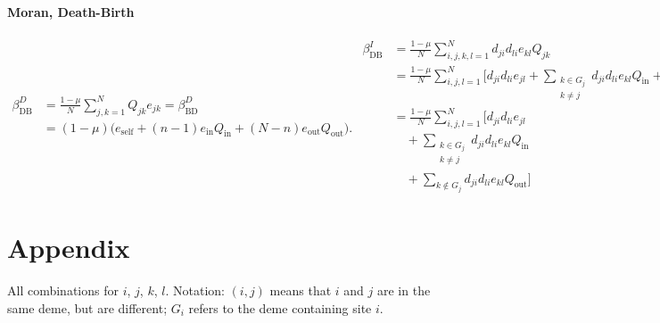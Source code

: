 \documentclass[11pt, letterpaper]{article}
\newcommand{\BD}{\textrm{BD}}
\newcommand{\DB}{\textrm{DB}}
\newcommand{\ein}{e_{\textrm{in}}}
\newcommand{\eself}{e_{\textrm{self}}}
\newcommand{\eout}{e_{\textrm{out}}}
\newcommand{\Qin}{Q_{\textrm{in}}}
\newcommand{\Qout}{Q_{\textrm{out}}}
\begin{document}
\paragraph{Moran, Death-Birth}
\begin{subequations}
\begin{align}
\beta_{\DB}^{D} & = \frac{1-\mu}{N} \sum_{j,k=1}^N Q_{jk} e_{jk} = \beta_{\BD}^D\nonumber \\
& = (1-\mu) \Big( \eself + (n-1) \ein \Qin + (N-n) \eout \Qout \Big).
\end{align}

\begin{align}
\beta_{\DB}^{I} & = \frac{1-\mu}{N} \sum_{i,j,k,l=1}^N d_{ji} d_{li} e_{kl} Q_{jk} \nonumber \\
%
& = \frac{1-\mu}{N} \sum_{i,j,l=1}^N \Bigg[ d_{ji} d_{li} e_{jl} + \sum_{\substack{k\in G_j\\k\neq j} }d_{ji} d_{li} e_{kl} \Qin + \sum_{k \not \in G_j} d_{ji} d_{li} e_{kl} \Qout \Bigg]
\nonumber\\
%
& = \frac{1-\mu}{N} \sum_{i, j,l=1}^N \Bigg[  d_{ji} d_{li} e_{jl} \nonumber \\
& \quad+ \sum_{\substack{k\in G_j\\k\neq j} }d_{ji} d_{li} e_{kl} \Qin \nonumber \\ %
& \quad + \sum_{k \not \in G_j} d_{ji} d_{li} e_{kl} \Qout \Bigg]
%
\end{align}
\end{subequations}

\clearpage
\appendix
\section*{Appendix}
All combinations for $i$, $j$, $k$, $l$. Notation: $(i, j)$ means that $i$ and $j$ are in the same deme, but are different; $G_i$ refers to the deme containing site $i$.
\end{document}
